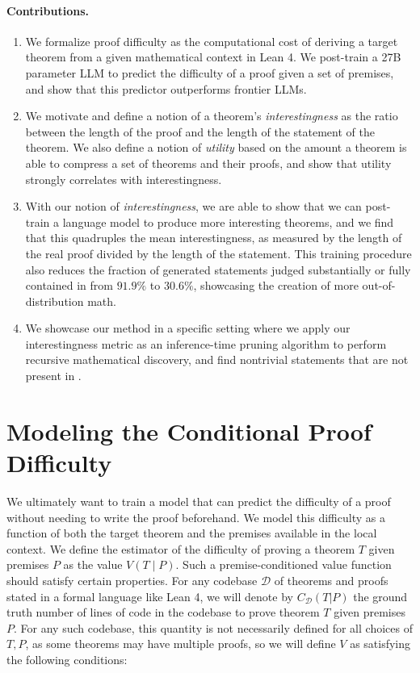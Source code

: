 \paragraph{Contributions.} 
\begin{enumerate}[leftmargin=1.4em]
  \item We formalize proof difficulty as the computational cost of deriving a target theorem from a given mathematical context in Lean 4. We post-train a 27B parameter LLM to predict the difficulty of a proof given a set of premises, and show that this predictor outperforms frontier LLMs.

  \item We motivate and define a notion of a theorem's \emph{interestingness} as the ratio between the length of the proof and the length of the statement of the theorem. We also define a notion of \emph{utility} based on the amount a theorem is able to compress a set of theorems and their proofs, and show that utility strongly correlates with interestingness.

  \item With our notion of \emph{interestingness}, we are able to show that we can post-train a language model to produce more interesting theorems, and we find that this quadruples the mean interestingness, as measured by the length of the real proof divided by the length of the statement. This training procedure also reduces the fraction of generated statements judged substantially or fully contained in \Mathlib from $91.9\%$ to $30.6\%$, showcasing the creation of more out-of-distribution math.
  
  \item We showcase our method in a specific setting where we apply our interestingness metric as an inference-time pruning algorithm to perform recursive mathematical discovery, and find nontrivial statements that are not present in \Mathlib.

\end{enumerate}

\section{Modeling the Conditional Proof Difficulty}
\label{sec:difficulty}

We ultimately want to train a model that can predict the difficulty of a proof without needing to write the proof beforehand. 
%
We model this difficulty as a function of both the target theorem and the premises available in the local context. 
%
We define the estimator of the difficulty of proving a theorem $T$ given premises $P$ as the value $V(T \mid P)$.
%
Such a premise-conditioned value function should satisfy certain properties.
%
For any codebase $\mathcal D$ of theorems and proofs stated in a formal language like Lean 4, we will denote by $C_\mathcal D(T|P)$ the ground truth number of lines of code in the codebase to prove theorem $T$ given premises $P$.
%
For any such codebase, this quantity is not necessarily defined for all choices of $T,P$, as some theorems may have multiple proofs, so we will define $V$ as satisfying the following conditions:

